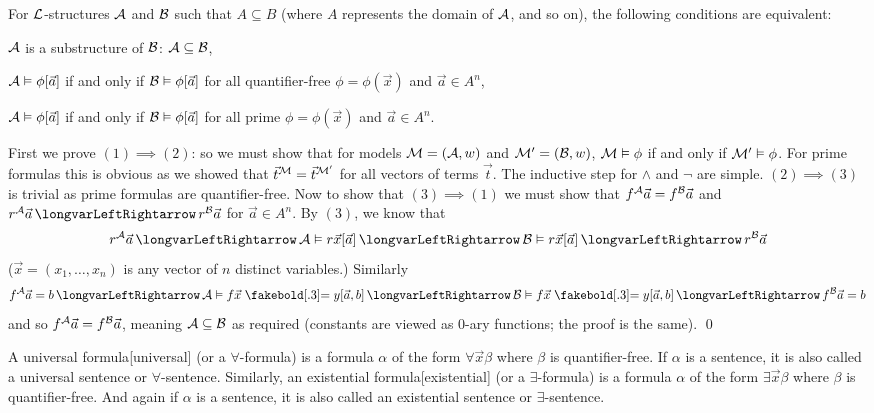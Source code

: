 \bthrm[title=The Substructure Theorem, name=substructuretheorem]

    For $\cal L$-structures ${\cal A}$ and ${\cal B}$ such that $A\subseteq B$ (where $A$ represents the domain of ${\cal A}$, and so on), the following conditions are equivalent:
    \benum
        \item ${\cal A}$ is a substructure of ${\cal B}$: ${\cal A}\subseteq{\cal B}$,
        \item ${\cal A}\vDash\phi[\vec a]$ if and only if ${\cal B}\vDash\phi[\vec a]$ for all quantifier-free $\phi=\phi(\vec x)$ and $\vec a\in A^n$,
        \item ${\cal A}\vDash\phi[\vec a]$ if and only if ${\cal B}\vDash\phi[\vec a]$ for all prime $\phi=\phi(\vec x)$ and $\vec a\in A^n$.
    \eenum

\ethrm

First we prove $(1)\implies(2)$: so we must show that for models ${\cal M}=({\cal A},w)$ and ${\cal M}'=({\cal B},w)$, ${\cal M}\vDash\phi$ if and only if ${\cal M}'\vDash\phi$.
For prime formulas this is obvious as we showed that $\vec t^{\cal M}=\vec t^{\cal M'}$ for all vectors of terms $\vec t$.
The inductive step for $\land$ and $\neg$ are simple.
$(2)\implies(3)$ is trivial as prime formulas are quantifier-free.
Now to show that $(3)\implies(1)$ we must show that $f^{\cal A}\vec a=f^{\cal B}\vec a$ and $r^{\cal A}\vec a\iff r^{\cal B}\vec a$ for $\vec a\in A^n$.
By $(3)$, we know that
$$ r^{\cal A}\vec a \iff {\cal A}\vDash r\vec x[\vec a] \iff {\cal B}\vDash r\vec x[\vec a] \iff r^{\cal B}\vec a $$
($\vec x=(x_1,\dots,x_n)$ is any vector of $n$ distinct variables.)
Similarly
$$ f^{\cal A}\vec a = b \iff {\cal A}\vDash f\vec x\eq y[\vec a,b] \iff {\cal B}\vDash f\vec x\eq y[\vec a,b] \iff f^{\cal B}\vec a=b $$
and so $f^{\cal A}\vec a=f^{\cal B}\vec a$, meaning ${\cal A}\subseteq{\cal B}$ as required (constants are viewed as $0$-ary functions; the proof is the same).
\qed

\bdefn

    A {\emphcolor universal formula}[universal] (or a {\emphcolor $\forall$-formula}) is a formula $\alpha$ of the form $\forall\vec x\beta$ where $\beta$ is quantifier-free.
    If $\alpha$ is a sentence, it is also called a {\emphcolor universal sentence} or {\emphcolor $\forall$-sentence}.
    Similarly, an {\emphcolor existential formula}[existential] (or a {\emphcolor $\exists$-formula}) is a formula $\alpha$ of the form $\exists\vec x\beta$ where $\beta$ is
    quantifier-free.
    And again if $\alpha$ is a sentence, it is also called an {\emphcolor existential sentence} or {\emphcolor $\exists$-sentence}.

